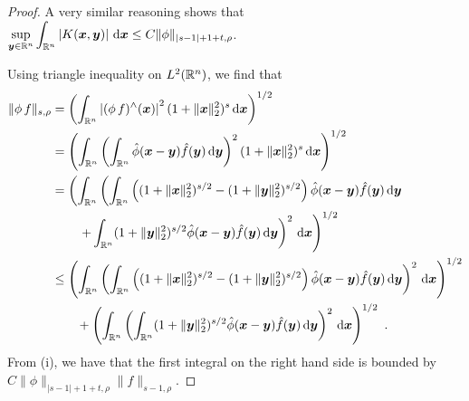 \begin{proof}
A very similar reasoning shows that
$\displaystyle
\sup_{{\bm{y}}\in \mathbb{R}^n} \int_{\mathbb{R}^n} \left|K({\bm{x}},{\bm{y}})\right|
\,\mathrm{d}{{\bm{x}}} \leq C \|\phi\|_{|s-1|+1+t,\rho}$.

  Using triangle inequality on $L^2(\mathbb{R}^n)$, we find that
\begin{align*}
\|\phi\, f \|_{s,\rho}
&= \left( \int_{\mathbb{R}^n} \left|(\phi\,f)^\wedge({\bm{x}})\right|^2
(1 + \|{\bm{x}}\|_2^2)^s \,\mathrm{d}{{\bm{x}}} \right)^{1/2} \\
&= \left( \int_{\mathbb{R}^n} \left( \int_{\mathbb{R}^n} \hat{\phi}({\bm{x}}-{\bm{y}})
    \hat{f}({\bm{y}}) \,\mathrm{d}{{\bm{y}}} \right)^2
(1 + \|{\bm{x}}\|_2^2)^s \,\mathrm{d}{{\bm{x}}} \right)^{1/2} \\
&= \left( \int_{\mathbb{R}^n} \left( \int_{\mathbb{R}^n}
\left( (1 + \|{\bm{x}}\|_2^2)^{s/2} - (1 + \|{\bm{y}}\|_2^2)^{s/2}\right)
\hat{\phi}({\bm{x}}-{\bm{y}}) \hat{f}({\bm{y}}) \,\mathrm{d}{{\bm{y}}} \right. \right. \\
&\qquad \left. \left. 
+ \int_{\mathbb{R}^n} (1 + \|{\bm{y}}\|_2^2)^{s/2} \hat{\phi}({\bm{x}}-{\bm{y}})
\hat{f}({\bm{y}}) \,\mathrm{d}{{\bm{y}}} \right)^2 \,\mathrm{d}{{\bm{x}}} \right)^{1/2} \\
&\leq \left( \int_{\mathbb{R}^n} \left( \int_{\mathbb{R}^n}
\left( (1 + \|{\bm{x}}\|_2^2)^{s/2} - (1 + \|{\bm{y}}\|_2^2)^{s/2}\right)
\hat{\phi}({\bm{x}}-{\bm{y}}) \hat{f}({\bm{y}}) \,\mathrm{d}{{\bm{y}}} \right)^2
  \,\mathrm{d}{{\bm{x}}} \right)^{1/2} \\
&\qquad + \left( \int_{\mathbb{R}^n} \left(
\int_{\mathbb{R}^n} (1 + \|{\bm{y}}\|_2^2)^{s/2} \hat{\phi}({\bm{x}}-{\bm{y}})
\hat{f}({\bm{y}}) \,\mathrm{d}{{\bm{y}}} \right)^2 \,\mathrm{d}{{\bm{x}}} \right)^{1/2} \ .
\end{align*}
From (i), we have that the first integral on the right hand side is
bounded by\\
$C \|\phi\|_{|s-1|+1+t,\rho}\|f \|_{s-1,\rho}$.


\end{proof}
